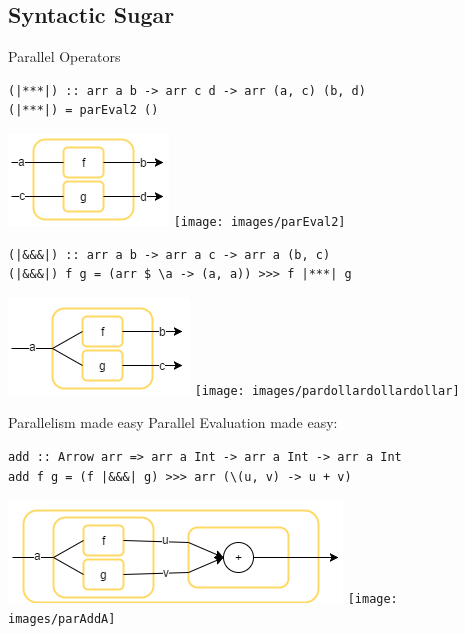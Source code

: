 \subsection{Syntactic Sugar}
\begin{frame}[fragile]{Parallel Operators}
\begin{lstlisting}[frame=htrbl]
(|***|) :: arr a b -> arr c d -> arr (a, c) (b, d)
(|***|) = parEval2 ()
\end{lstlisting}
\begin{center}
\includegraphics[scale=0.5]{images/starstarstar}
\hspace{2em}
\texttt{[image: images/parEval2]}
\end{center}
\begin{lstlisting}[frame=htrbl]
(|&&&|) :: arr a b -> arr a c -> arr a (b, c)
(|&&&|) f g = (arr $ \a -> (a, a)) >>> f |***| g
\end{lstlisting}
\begin{center}
	\includegraphics[scale=0.5]{images/dollardollardollar}
	\hspace{2em}
	\texttt{[image: images/pardollardollardollar]}
\end{center}
\end{frame}

\begin{frame}[fragile]{Parallelism made easy}
Parallel Evaluation made easy:
\begin{lstlisting}[frame=htrbl]
add :: Arrow arr => arr a Int -> arr a Int -> arr a Int
add f g = (f |&&&| g) >>> arr (\(u, v) -> u + v)
\end{lstlisting}
\begin{center}
	\includegraphics[scale=0.6]{images/addA-comb}
	\hspace{2em}
	\texttt{[image: images/parAddA]}
\end{center}
\end{frame}